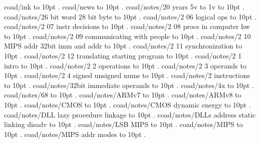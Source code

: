 \smallskip
\par\endgroup
\bigskip
coad/ink \leaders\hbox to 10pt {\hss.\hss}  \hfill {}
\smallskip
coad/news \leaders\hbox to 10pt {\hss.\hss}  \hfill {}
\smallskip
coad/notes/20 years 5v to 1v \leaders\hbox to 10pt {\hss.\hss}  \hfill {}
\smallskip
coad/notes/26 bit word 28 bit byte \leaders\hbox to 10pt {\hss.\hss}  \hfill {}
\smallskip
coad/notes/2 06 logical ops \leaders\hbox to 10pt {\hss.\hss}  \hfill {}
\smallskip
coad/notes/2 07 instr decisions \leaders\hbox to 10pt {\hss.\hss}  \hfill {}
\smallskip
coad/notes/2 08 procs in computer hw \leaders\hbox to 10pt {\hss.\hss}  \hfill {}
\smallskip
coad/notes/2 09 communicating with people \leaders\hbox to 10pt {\hss.\hss}  \hfill {}
\smallskip
coad/notes/2 10 MIPS addr 32bit imm and addr \leaders\hbox to 10pt {\hss.\hss}  \hfill {}
\smallskip
coad/notes/2 11 synchronization \leaders\hbox to 10pt {\hss.\hss}  \hfill {}
\smallskip
coad/notes/2 12 translating starting program \leaders\hbox to 10pt {\hss.\hss}  \hfill {}
\smallskip
coad/notes/2 1 intro \leaders\hbox to 10pt {\hss.\hss}  \hfill {}
\smallskip
coad/notes/2 2 operations \leaders\hbox to 10pt {\hss.\hss}  \hfill {}
\smallskip
coad/notes/2 3 operands \leaders\hbox to 10pt {\hss.\hss}  \hfill {}
\smallskip
coad/notes/2 4 signed unsigned nums \leaders\hbox to 10pt {\hss.\hss}  \hfill {}
\smallskip
coad/notes/2 instructions \leaders\hbox to 10pt {\hss.\hss}  \hfill {}
\smallskip
coad/notes/32bit immediate operands \leaders\hbox to 10pt {\hss.\hss}  \hfill {}
\smallskip
coad/notes/4x \leaders\hbox to 10pt {\hss.\hss}  \hfill {}
\smallskip
coad/notes/68 \leaders\hbox to 10pt {\hss.\hss}  \hfill {}
\smallskip
coad/notes/ARMv7 \leaders\hbox to 10pt {\hss.\hss}  \hfill {}
\smallskip
coad/notes/ARMv8 \leaders\hbox to 10pt {\hss.\hss}  \hfill {}
\smallskip
coad/notes/CMOS \leaders\hbox to 10pt {\hss.\hss}  \hfill {}
\smallskip
coad/notes/CMOS dynamic energy \leaders\hbox to 10pt {\hss.\hss}  \hfill {}
\smallskip
coad/notes/DLL lazy procedure linkage \leaders\hbox to 10pt {\hss.\hss}  \hfill {}
\smallskip
coad/notes/DLLs address static linking disadv \leaders\hbox to 10pt {\hss.\hss}  \hfill {}
\smallskip
coad/notes/LSB MIPS \leaders\hbox to 10pt {\hss.\hss}  \hfill {}
\smallskip
coad/notes/MIPS \leaders\hbox to 10pt {\hss.\hss}  \hfill {}
\smallskip
coad/notes/MIPS addr modes \leaders\hbox to 10pt {\hss.\hss}  \hfill {}
